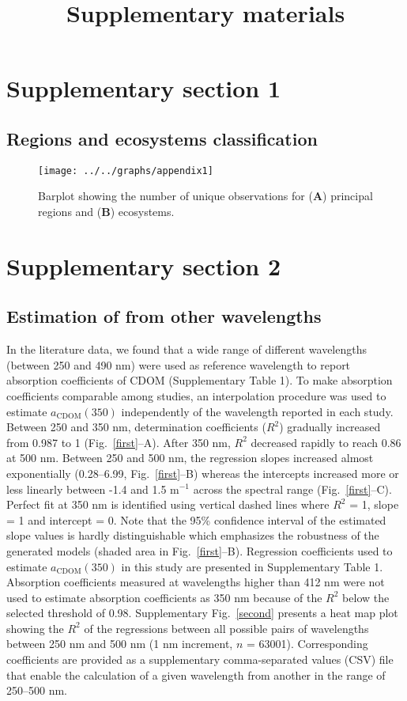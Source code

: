 \documentclass[12pt,a4paper]{scrartcl}
\title{Supplementary materials}
\date{}
\begin{document}
\maketitle

\section*{Supplementary section 1}
\subsection*{Regions and ecosystems classification}

\begin{figure}[H]
	\centering
	\texttt{[image: ../../graphs/appendix1]}
	\caption{Barplot showing the number of unique observations for (\textbf{A}) principal regions and (\textbf{B}) ecosystems.}
\end{figure}

\clearpage
\newpage

\section*{Supplementary section 2}
\subsection*{Estimation of  from other wavelengths}

In the literature data, we found that a wide range of different wavelengths (between 250 and 490 nm) were used as reference wavelength to report absorption coefficients of CDOM (Supplementary Table 1). To make absorption coefficients comparable among studies, an interpolation procedure was used to estimate $a_{\text{CDOM}}(350)$ independently of the wavelength reported in each study. Between 250 and 350 nm, determination coefficients ($R^2$) gradually increased from 0.987 to 1 (Fig.~\ref{first}--A). After 350 nm, $R^2$ decreased rapidly to reach 0.86 at 500 nm. Between 250 and 500 nm, the regression slopes increased almost exponentially (0.28--6.99, Fig.~\ref{first}--B) whereas the intercepts increased more or less linearly between -1.4 and 1.5 m$^{-1}$ across the spectral range (Fig.~\ref{first}--C). Perfect fit at 350 nm is identified using vertical dashed lines where $R^2$ = 1, slope = 1 and intercept = 0. Note that the 95\% confidence interval of the estimated slope values is hardly distinguishable which emphasizes the robustness of the generated models (shaded area in Fig.~\ref{first}--B). Regression coefficients used to estimate $a_{\text{CDOM}}(350)$ in this study are presented in Supplementary Table 1. Absorption coefficients measured at wavelengths higher than 412 nm were not used to estimate absorption coefficients as 350 nm because of the $R^2$ below the selected threshold of 0.98. Supplementary Fig.~\ref{second} presents a heat map plot showing the $R^2$ of the regressions between all possible pairs of wavelengths between 250 nm and 500 nm (1 nm increment, $n$ = 63001). Corresponding coefficients are provided as a supplementary comma-separated values (CSV) file that enable the calculation of a given wavelength from another in the range of 250--500 nm.
\end{document}
